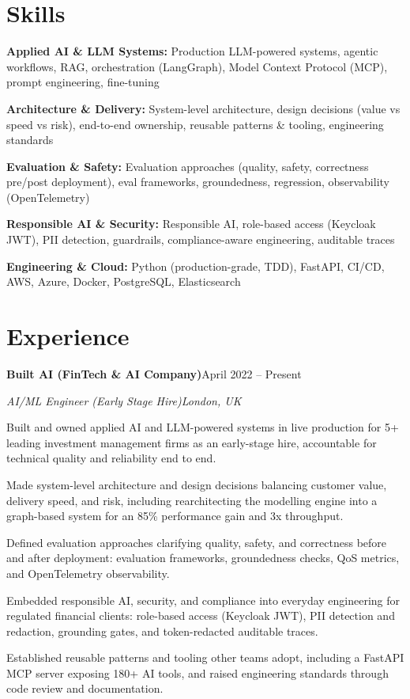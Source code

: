 \documentclass[10pt,a4paper]{article}
\newcommand{\entry}[4]{%
  {\color{company}\bfseries #1}\hfill {\color{muted}#2}\par
  \vspace{1pt}
  {\itshape #3}\hfill {\color{muted}\itshape #4}\par
  \vspace{3pt}%
}
\begin{document}
\section{Skills}
\begin{tight}
  \item[\textcolor{accent}{\small$\bullet$}] \textbf{Applied AI \& LLM Systems:} Production LLM-powered systems, agentic workflows, RAG, orchestration (LangGraph), Model Context Protocol (MCP), prompt engineering, fine-tuning
  \item[\textcolor{accent}{\small$\bullet$}] \textbf{Architecture \& Delivery:} System-level architecture, design decisions (value vs speed vs risk), end-to-end ownership, reusable patterns \& tooling, engineering standards
  \item[\textcolor{accent}{\small$\bullet$}] \textbf{Evaluation \& Safety:} Evaluation approaches (quality, safety, correctness pre/post deployment), eval frameworks, groundedness, regression, observability (OpenTelemetry)
  \item[\textcolor{accent}{\small$\bullet$}] \textbf{Responsible AI \& Security:} Responsible AI, role-based access (Keycloak JWT), PII detection, guardrails, compliance-aware engineering, auditable traces
  \item[\textcolor{accent}{\small$\bullet$}] \textbf{Engineering \& Cloud:} Python (production-grade, TDD), FastAPI, CI/CD, AWS, Azure, Docker, PostgreSQL, Elasticsearch
\end{tight}

\section{Experience}
\entry{Built AI (FinTech \& AI Company)}{April 2022 -- Present}{AI/ML Engineer (Early Stage Hire)}{London, UK}
\begin{tight}
  \item Built and owned applied AI and LLM-powered systems in live production for 5+ leading investment management firms as an early-stage hire, accountable for technical quality and reliability end to end.
  \item Made system-level architecture and design decisions balancing customer value, delivery speed, and risk, including rearchitecting the modelling engine into a graph-based system for an 85\% performance gain and 3x throughput.
  \item Defined evaluation approaches clarifying quality, safety, and correctness before and after deployment: evaluation frameworks, groundedness checks, QoS metrics, and OpenTelemetry observability.
  \item Embedded responsible AI, security, and compliance into everyday engineering for regulated financial clients: role-based access (Keycloak JWT), PII detection and redaction, grounding gates, and token-redacted auditable traces.
  \item Established reusable patterns and tooling other teams adopt, including a FastAPI MCP server exposing 180+ AI tools, and raised engineering standards through code review and documentation.
\end{tight}
\end{document}
